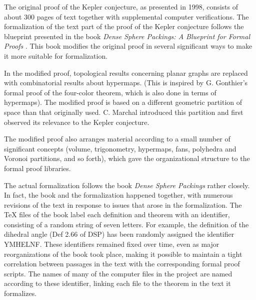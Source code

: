The original proof of the Kepler conjecture, as presented in 1998, consists of about 300 pages of text together with supplemental
computer verifications.    The formalization of the text part of the proof of the Kepler conjecture follows the blueprint presented
in the book {\it Dense Sphere Packings: A Blueprint for Formal Proofs} \cite{XX}.  This book modifies the original proof in several
significant ways to make it more suitable for formalization.   

In the modified proof,  topological results concerning planar graphs are replaced with combinatorial results about hypermaps.
(This is inspired by G. Gonthier's formal proof of the four-color theorem, which is also done in terms of hypermaps).
The modified proof is based on a different geometric partition of space than that originally used.  C. Marchal
introduced this partition and first observed its
relevance to the Kepler conjecture.  

The modified proof also arranges material according to a small number of significant concepts
(volume, trigonometry, hypermaps, fans, polyhedra and Voronoi partitions, and so forth), which
gave the organizational structure to the formal proof libraries.

The actual formalization follows the book {\it Dense Sphere Packings} rather closely.  In fact, the book and the formalization
happened together, with numerous revisions of the text in response to issues that arose in the formalization.  The TeX files
of the book label each definition and theorem with an identifier, 
consisting of a random string of seven letters.  For example, the definition of the dihedral angle (Def 2.66 of DSP) has been randomly
assigned the identifier YMHELNF. These identifiers remained
fixed over time, even as major reorganizations of the book took place, making it possible to maintain a tight  correlation between
 passages in the text with
the corresponding formal proof scripts.  The names of many of the computer files in the project are named according to
these identifier, linking each file to the theorem in the text it formalizes.

